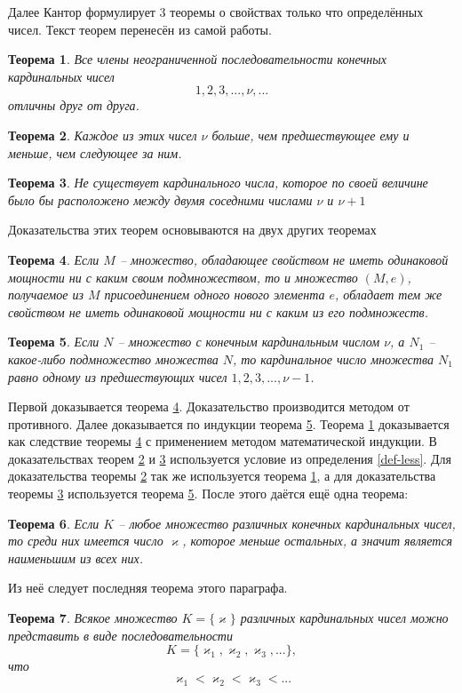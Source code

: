 \documentclass[a4paper,12pt]{extarticle}
\newtheorem{theorem}{Теорема}[subsection]
\theoremstyle{definition}
\begin{document}
Далее Кантор формулирует 3 теоремы о свойствах только что определённых чисел.
Текст теорем перенесён из самой работы.
\begin{theorem}
\label{A}
Все члены неограниченной последовательности конечных кардинальных чисел $$1, 2, 3, ..., \nu,...$$ отличны друг от друга.
\end{theorem}
\begin{theorem}
\label{B}
Каждое из этих чисел $\nu$ больше, чем предшествующее ему и меньше, чем следующее за ним.
\end{theorem}
\begin{theorem}
\label{C}
Не существует кардинального числа, которое по своей величине было бы расположено между двумя соседними числами $\nu$ и $\nu + 1$
\end{theorem}
Доказательства этих теорем основываются на двух других теоремах
\begin{theorem}
\label{D}
Если $M$ -- множество, обладающее свойством не иметь одинаковой мощности ни с каким своим подмножеством, то и множество $(M, e)$,
получаемое из $M$ присоединением  одного нового элемента $e$, обладает тем же свойством не иметь одинаковой мощности ни с каким из его подмножеств.
\end{theorem}
\begin{theorem}
\label{E}
Если $N$ -- множество с конечным кардинальным числом $\nu$, а $N_1$ -- какое-либо подмножество множества $N$, то кардинальное число множества $N_1$ равно одному из предшествующих чисел $1, 2, 3, ..., \nu - 1$.
\end{theorem}

Первой доказывается теорема \ref{D}.
Доказательство производится методом от противного.
Далее доказывается по индукции теорема \ref{E}.
Теорема \ref{A} доказывается как следствие теоремы \ref{D} с применением методом математической индукции.
В доказательствах теорем \ref{B} и \ref{C} используется условие из определения \ref{def-less}.
Для доказательства теоремы \ref{B} так же используется теорема \ref{A}, а для доказательства теоремы \ref{C} используется теорема \ref{E}.
После этого даётся ещё одна теорема:
\begin{theorem}
\label{F}
Если $K$ -- любое множество различных конечных кардинальных чисел, то среди них имеется число $\varkappa$, которое меньше остальных, а значит является наименьшим из всех них.
\end{theorem}
Из неё следует последняя теорема этого параграфа.
\begin{theorem}
\label{G}
    Всякое множество $K = \{\varkappa\}$ различных кардинальных чисел можно представить в виде последовательности 
    $$K = \{\varkappa_1, \varkappa_2, \varkappa_3, ...\},$$ что $$\varkappa_1 < \varkappa_2 < \varkappa_3 < ...$$
\end{theorem}
\end{document}

